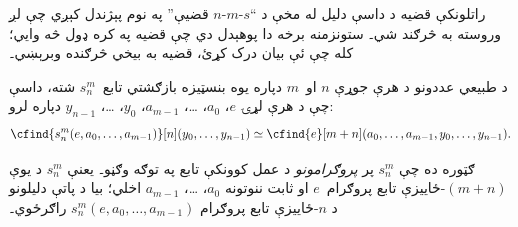 \documentclass[../../../include/open-logic-section]{subfiles}
\begin{document}

\begin{explain}
راتلونکې قضيه د داسې دليل له مخې د ``$s$-$m$-$n$ قضيې'' په نوم
پېژندل کېږي چې لږ وروسته به څرګند شي۔ ستونزمنه برخه دا پوهېدل دي چې
قضيه په کره ډول څه وايي؛ کله چې ئې بيان درک کړئ، قضيه به بيخي څرګنده
وبرېښي۔
\end{explain}

\begin{thm}
  د طبيعي عددونو د هرې جوړې $n$ او~$m$ دپاره يوه بنسټيزه بازګشتي
  تابع~$s^m_n$ شته، داسې چې د هرې لړۍ
  $e$، $a_0$، \dots، $a_{m-1}$، $y_0$، \dots، $y_{n-1}$ دپاره لرو:
  \[
  \cfind{s^m_n(e, a_0, \dots, a_{m-1})}[n](y_0, \dots, y_{n-1}) \simeq
  \cfind{e}[m+n](a_0, \dots, a_{m-1}, y_0, \dots, y_{n-1}).
\]
\end{thm}

\begin{explain}
ګټوره ده چې $s^m_n$ پر \emph{پروګرامونو} د عمل کوونکې تابع په توګه
وګڼو۔ يعنې $s^m_n$ د يوې $(m+n)$-ځاييزې تابع پروګرام~$e$ او ثابت
ننوتونه $a_0$، \dots، $a_{m-1}$ اخلي؛ بيا د پاتې دليلونو د
$n$-ځاييزې تابع پروګرام $s^m_n(e, a_0, \dots, a_{m-1})$ راګرځوي۔
\end{explain}
\end{document}
